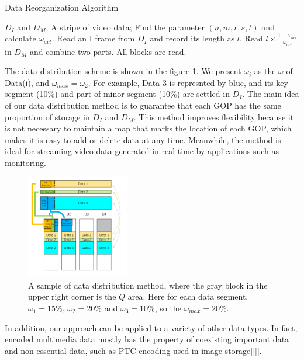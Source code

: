 \documentclass[sigconf]{acmart}
\begin{document}
\begin{algorithm}[htb] 
\caption{Data Reorganization Algorithm} 
\label{alg-data-reor} 
\begin{algorithmic}[1] 
\Require $D_I$ and $D_M$;
\Ensure A stripe of video data;
\State Find the parameter $(n,m,r,s,t)$ and calculate $\omega_{act}$.
\Repeat
\State Read an I frame from $D_I$ and record its length as $l$.
\State Read $l \times \frac{1-\omega_{act}}{\omega_{act}}$ in $D_M$ and combine two parts.
\Until All blocks are read.
\end{algorithmic} 
\end{algorithm}

The data distribution scheme is shown in the figure \ref{Data-distribution-v2}. We present $\omega_i$ as the $\omega$ of Data(i), and $\omega_{max} = \omega_2$.
For example, Data 3 is represnted by blue, and its key segment (10\%) and part of minor segment (10\%) are settled in $D_I$.
The main idea of our data distribution method is to guarantee that each GOP has the same proportion of storage in $D_I$ and $D_M$. This method improves flexibility because it is not necessary to maintain a map that marks the location of each GOP, which makes it is easy to add or delete data at any time. Meanwhile, the method is ideal for streaming video data generated in real time by applications such as monitoring.

\begin{figure}[htb]
\centering
\includegraphics[width=0.4\textwidth]{photo/Data-distribution-v2.pdf}
\caption{A sample of data distribution method, where the gray block in the upper right corner is the $Q$ area. Here for each data segment, $\omega_1=15\%$, $\omega_2=20\%$ and $\omega_3=10\%$, so the $\omega_{max}=20\%$.}
\label{Data-distribution-v2}
\end{figure}

In addition, our approach can be applied to a variety of other data types. In fact, encoded multimedia data mostly has the property of coexisting important data and non-essential data, such as PTC encoding used in image storage[][].
\end{document}
